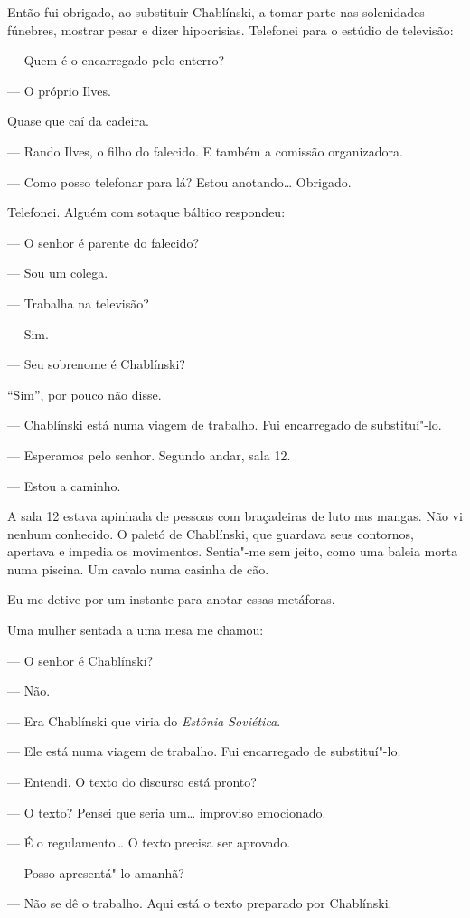 Então fui obrigado, ao substituir Chablínski, a tomar parte nas
solenidades fúnebres, mostrar pesar e dizer hipocrisias. Telefonei para
o estúdio de televisão:

--- Quem é o encarregado pelo enterro?

--- O próprio Ilves.

Quase que caí da cadeira.

--- Rando Ilves, o filho do falecido. E também a comissão organizadora.

--- Como posso telefonar para lá? Estou anotando\ldots{} Obrigado.

Telefonei. Alguém com sotaque báltico respondeu:

--- O senhor é parente do falecido?

--- Sou um colega.

--- Trabalha na televisão?

--- Sim.

--- Seu sobrenome é Chablínski?

``Sim'', por pouco não disse.

--- Chablínski está numa viagem de trabalho. Fui encarregado de
substituí"-lo.

--- Esperamos pelo senhor. Segundo andar, sala 12.

--- Estou a caminho.

A sala 12 estava apinhada de pessoas com braçadeiras de luto nas mangas.
Não vi nenhum conhecido. O paletó de Chablínski, que guardava seus
contornos, apertava e impedia os movimentos. Sentia"-me sem jeito, como
uma baleia morta numa piscina. Um cavalo numa casinha de cão.

Eu me detive por um instante para anotar essas metáforas.

Uma mulher sentada a uma mesa me chamou:

--- O senhor é Chablínski?

--- Não.

--- Era Chablínski que viria do \emph{Estônia Soviética}.

--- Ele está numa viagem de trabalho. Fui encarregado de substituí"-lo.

--- Entendi. O texto do discurso está pronto?

--- O texto? Pensei que seria um\ldots{} improviso emocionado.

--- É o regulamento\ldots{} O texto precisa ser aprovado.

--- Posso apresentá"-lo amanhã?

--- Não se dê o trabalho. Aqui está o texto preparado por Chablínski.

